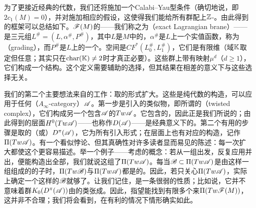 为了更接近经典的\trHomology{}代数，我们还将施加一个Calabi--Yau型条件（确切地说，即$2c_1(M)=0$），并对\trLagrange\trSubmanifold{}施加相应的假设，这使得我们能给所有\trFloer{}群配上$\mathbb{Z}$-\trGrading。由此得到的框架可以总结如下。\trFukayaCategory{}$\mathscr{F}(M)$的\trObject——我们称之为\textbf{\trExactLagrangianBrane}（exact Lagrangian brane）——是三元组$L^\#=(L,\alpha^\#,P^\#)$，其中$L$是$M$中\trClosed{}的\trExact\trLagrange\trSubmanifold，$\alpha^\#$是$L$上一个实值函数，称为\trGrading（grading），而$P^\#$是$L$上的一个\trPinStructure。\trMorphism{}空间是\trFloerCochainGroup{}$CF^*(L_0^\#,L_1^\#)$，它们是有限维\trGraded\trVectorSpace（\trCoefficients{}域$\mathbb{K}$取定但任意；\trPinStructure{}其实只在$\mathrm{char}(\mathbb{K})\neq 2$时才真正必要）。这些群上带有\trMultilinear\trComposition{}映射$\mu^d$（$d \geq 1$），它们构成一个\trAinfty{}结构。这个定义需要辅助的选择，但其结果在相差\trQuasiisomorphism{}的意义下与这些选择无关。

我们的第二个主要想法来自\trKontsevich{}的工作：取\trFukayaCategory{}的形式扩大。这些是纯代数的构造，可以应用于任何\textbf{\trACategory}（$A_\infty$-category）$\mathscr{A}$。第一步是引入\trChainComplex{}的类似物，即所谓的\trTwistedComplex（twisted complex），它们构成另一个包含$\mathscr{A}$的\trACategory{}$Tw\mathscr{A}$。它包含\trMorphism{}的\trMappingCone，因此正是我们所说的\trTriangulated\trACategory；由此得到的\trCohomology{}层面\trCategory{}$H^0(Tw\mathscr{A})$——也称作\trDerivedCategory{}$D(\mathscr{A})$——是经典意义下的\trTriangulated{}\trCategory。第二个有用的步骤是取\trDerivedCategory{}的\trSplitClosure（或\trKaroubi{}\trCompletion）$D^\pi(\mathscr{A})$，它为所有\trIdempotent\trEndomorphism{}引入形式\trDirectSummand；在\trAinfty{}层面上也有对应的构造，记作$\Pi(Tw\mathscr{A})$。有一个看似悖论、但其真确性对许多读者显而易见的陈述：每一次扩大都使这个\trCategory{}更容易描述。举一个例子——考虑\trSplitting\trGenerator{}的概念：若从一组\trObject{}出发，反复应用\trMappingCone{}并\trSplitting{}出\trDirectSummand，便能构造出全部\trObject，我们就说这组\trObject{}\trSplitGeneration{}了$\Pi(Tw\mathscr{A})$。每当$\mathscr{B} \subset \Pi(Tw\mathscr{A})$是由这样一组\trSplitting\trGenerator{}组成的\trFull{}的\trAinfty{}子\trCategory{}时，$\Pi(Tw\mathscr{B})$与$\Pi(Tw\mathscr{A})$都是\trQuasiequivalence{}的\trACategory。因此，若只关心$\Pi(Tw\mathscr{A})$，实际上确定一个这样的$\mathscr{B}$就够了。让我们记住，\trSplitGeneration{}是一条很弱的性质；比如说，它并不意味着\trGrothendieck{}群$K_0(D^\pi(\mathscr{A}))$由\trSplitting\trGenerator{}的类张成。因此，指望能找到有限多个\trLagrange\trSubmanifold{}来\trSplitGeneration{}$\Pi(Tw\mathscr{F}(M))$，这并非不合理；我们将会看到，在有利的情况下情形确实如此。

